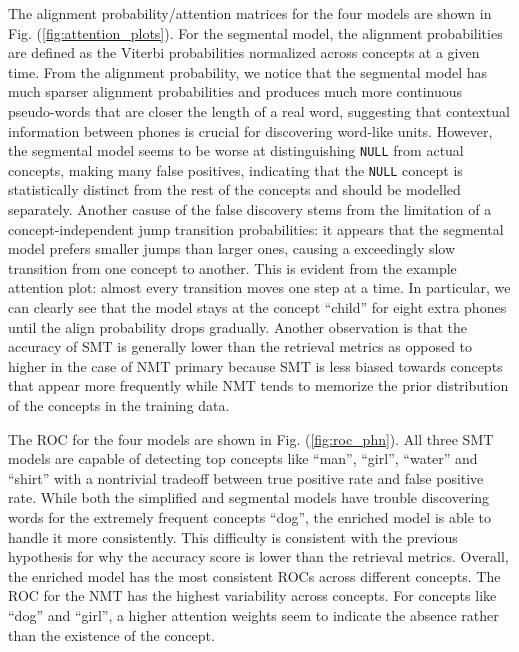 \documentclass[journal]{IEEEtran}
\begin{document}
The alignment probability/attention matrices for the four models are shown in Fig. (\ref{fig:attention_plots}). For the segmental model, the alignment probabilities are defined as the Viterbi probabilities normalized across concepts at a given time.  From the alignment probability, we notice that the segmental model has much sparser alignment probabilities and produces much more continuous pseudo-words that are closer the length of a real word, suggesting that contextual information between phones is crucial for discovering word-like units. However, the segmental model seems to be worse at distinguishing \texttt{NULL} from actual concepts, making many false positives, indicating that the \texttt{NULL} concept is statistically distinct from the rest of the concepts and should be modelled separately. Another casuse of the false discovery stems from the limitation of a concept-independent jump transition probabilities: it appears that the segmental model prefers smaller jumps than larger ones, causing a exceedingly slow transition from one concept to another. This is evident from the example attention plot: almost every transition moves one step at a time. In particular, we can clearly see that the model stays at the concept ``child'' for eight extra phones until the align probability drops gradually. Another observation is that the accuracy of SMT is generally lower than the retrieval metrics as opposed to higher in the case of NMT primary because SMT is less biased towards concepts that appear more frequently while NMT tends to memorize the prior distribution of the concepts in the training data.

The ROC for the four models are shown in Fig. (\ref{fig:roc_phn}). All three SMT models are capable of detecting top concepts like ``man'', ``girl'', ``water'' and ``shirt'' with a nontrivial tradeoff between true positive rate and false positive rate. While both the simplified and segmental models have trouble discovering words for the extremely frequent concepts ``dog'', the enriched model is able to handle it more consistently. This difficulty is consistent with the previous hypothesis for why the accuracy score is lower than the retrieval metrics. Overall, the enriched model has the most consistent ROCs across different concepts. The ROC for the NMT has the highest variability across concepts. For concepts like ``dog'' and ``girl'', a higher attention weights seem to indicate the absence rather than the existence of the concept.    
\end{document}
